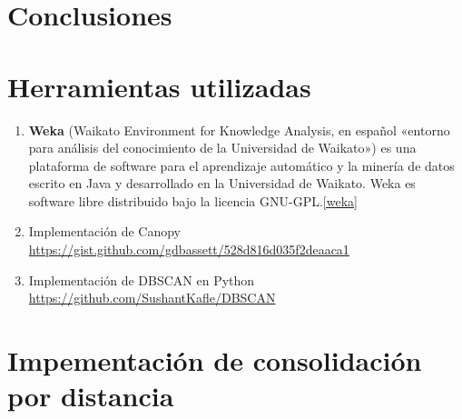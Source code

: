 \documentclass[a4paper, 12pt]{article}
\begin{document}

\pagebreak
\section{Conclusiones}

\pagebreak
\section{Herramientas utilizadas}

\begin{enumerate}
	\item \textbf{Weka} (Waikato Environment for Knowledge Analysis, en espa\~nol «entorno para an\'alisis del conocimiento de la Universidad de Waikato») es una plataforma de software para el aprendizaje autom\'atico y la miner\'ia de datos escrito en Java y desarrollado en la Universidad de Waikato. Weka es software libre distribuido bajo la licencia GNU-GPL.\ref{weka}
	\item Implementaci\'on de Canopy \\ \url{https://gist.github.com/gdbassett/528d816d035f2deaaca1}

	\item Implementaci\'on de DBSCAN en Python \\ \url{https://github.com/SushantKafle/DBSCAN}


\end{enumerate}

\newpage


\appendix
\section{Impementaci\'on de consolidaci\'on por distancia} \label{App:AppendixA}
\end{document}
